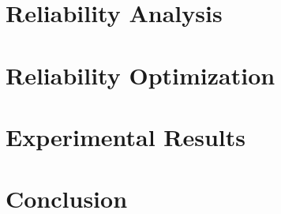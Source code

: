 \documentclass[conference]{IEEEtran}
\begin{document}
  \section{Reliability Analysis} 

  \section{Reliability Optimization}

  \section{Experimental Results} 

  \section{Conclusion} 
  

  \printbibliography

  \appendix
  
\end{document}

